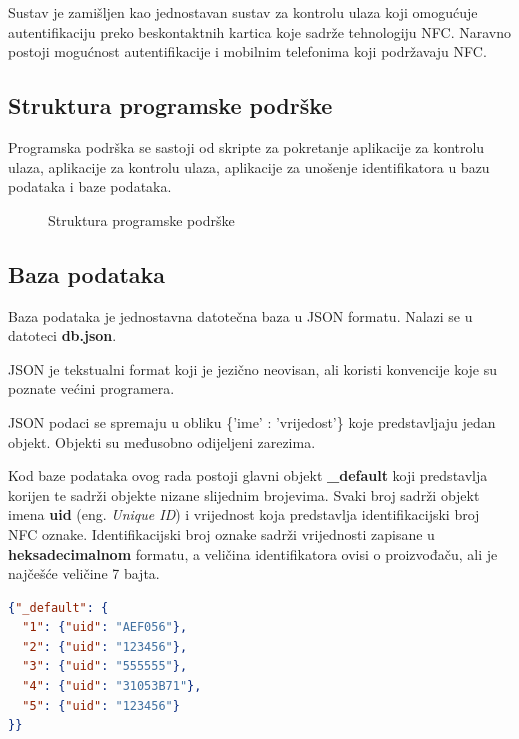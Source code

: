 \documentclass[times, utf8, zavrsni]{fer}
\begin{document}
Sustav je zamišljen kao jednostavan sustav za kontrolu ulaza koji omogućuje autentifikaciju preko beskontaktnih kartica koje sadrže tehnologiju NFC. Naravno postoji mogućnost autentifikacije i mobilnim telefonima koji podržavaju NFC. \par 

\subsection{Struktura programske podrške}
Programska podrška se sastoji od skripte za pokretanje aplikacije za kontrolu ulaza, aplikacije za kontrolu ulaza, aplikacije za unošenje identifikatora u bazu podataka i baze podataka.
\begin{figure}[H]
\caption{Struktura programske podrške}
\end{figure}

\subsection{Baza podataka}
Baza podataka je jednostavna datotečna baza u JSON formatu. Nalazi se u datoteci \textbf{db.json}.	\par
JSON je tekstualni format koji je jezično neovisan, ali koristi konvencije koje su poznate većini programera.\par
JSON podaci se spremaju u obliku \{'ime' : 'vrijedost'\} koje predstavljaju jedan objekt. Objekti su međusobno odijeljeni zarezima.\par 
Kod baze podataka ovog rada postoji glavni objekt \textbf{\_default} koji predstavlja korijen te sadrži objekte nizane slijednim brojevima. Svaki broj sadrži objekt imena \textbf{uid} (eng. \textit{Unique ID}) i vrijednost koja predstavlja identifikacijski broj NFC oznake. Identifikacijski broj oznake sadrži vrijednosti zapisane u \textbf{heksadecimalnom} formatu, a veličina identifikatora ovisi o proizvođaču, ali je najčešće veličine 7 bajta.

\begin{lstlisting}[language=json,firstnumber=1]
{"_default": {
  "1": {"uid": "AEF056"}, 
  "2": {"uid": "123456"},
  "3": {"uid": "555555"},
  "4": {"uid": "31053B71"},
  "5": {"uid": "123456"}
}}
\end{lstlisting}
\setlength{\parindent}{4ex}
\end{document}
